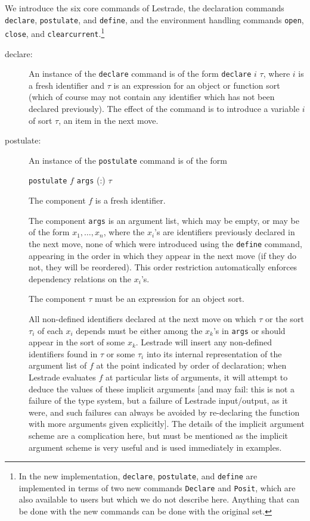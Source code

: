 \documentclass[12pt]{article}
\begin{document}
We introduce the six core commands of Lestrade, the declaration commands {\tt declare}, {\tt postulate}, and {\tt define}, and the environment handling commands {\tt open}, {\tt close}, and {\tt clearcurrent}.\footnote{In the new implementation, {\tt declare}, {\tt postulate}, and {\tt define} are implemented in terms of two new commands {\tt Declare} and {\tt Posit}, which are also available to users but which we do not describe here.  Anything that can be done with the new commands can be done with the original set.}

\begin{description}

\item[declare:] An instance of the {\tt declare} command is of the form {\tt declare} $i$ $\tau$, where $i$ is a fresh identifier and $\tau$ is an expression for an object or function sort (which of course may not contain any identifier which has not been declared previously).  The effect of the command is to introduce a variable $i$ of sort $\tau$, an item in the next move.

\item[postulate:] An instance of the {\tt postulate} command is of the form 

{\tt postulate} $f$ {\tt args} (:) $\tau$

The component $f$ is a fresh identifier.

The component {\tt args} is an argument list, which may be empty, or may be of the form $x_1,\ldots,x_n$, where the $x_i$'s are identifiers previously declared in the next move, none of which were introduced using the {\tt define} command, appearing in the order in which they appear in the next move (if they do not, they will be reordered).  This order restriction automatically enforces dependency relations
on the $x_i$'s.  

The component $\tau$ must be an expression for an object sort.  

All non-defined identifiers declared at the next move on which $\tau$ or the sort $\tau_i$ of each $x_i$ depends must be either among the $x_k$'s in {\tt args} or should appear in the sort of some $x_k$.  Lestrade will insert any non-defined identifiers found in $\tau$ or some $\tau_i$ into its internal representation of the argument list of $f$ at the point indicated by order of declaration;  when Lestrade evaluates $f$ at particular lists of arguments, it will attempt to deduce the values of these implicit arguments [and may fail:  this is not a failure of the type system, but a failure of Lestrade input/output, as it were, and such failures can always be avoided by re-declaring the function with more arguments given explicitly].  The details of the implicit argument scheme are a complication here, but must be mentioned as the implicit argument scheme is very useful and is used immediately in examples.


\end{description}
\end{document}
